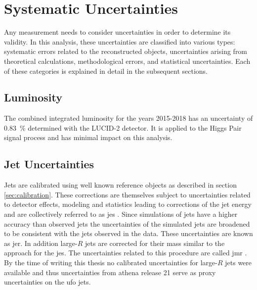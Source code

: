 \chapter{Systematic Uncertainties}\label{ch:systematics}
Any measurement needs to consider uncertainties in order to determine its validity. In this analysis, these uncertainties are classified into various types: systematic errors related to the reconstructed objects, uncertainties arising from theoretical calculations, methodological errors, and statistical uncertainties. Each of these categories is explained in detail in the subsequent sections.

\section{Luminosity}
The combined integrated luminosity for the years 2015-2018 has an uncertainty of \qty[]{0.83}{\percent} determined with the LUCID-2 detector. It is applied to the Higgs Pair signal process and has minimal impact on this analysis.

\section{Jet Uncertainties}
Jets are calibrated using well known reference objects as described in section \ref{sec:calibration}. These corrections are themselves subject to uncertainties related to detector effects, modeling and statistics leading to corrections of the jet energy and are collectively referred to as \ac{jes} \citep{atlas2021jet,Aaboud:2019aa}. Since simulations of jets have a higher accuracy than observed jets the uncertainties of the simulated jets are broadened to be consistent with the jets observed in the data. These uncertainties are known as \ac{jer}. In addition large-$R$ jets are corrected for their mass similar to the approach for the \ac{jes}. The uncertainties related to this procedure are called \ac{jmr} \citep{ATLAS-CONF-2020-022}. By the time of writing this thesis no calibrated uncertainties for large-$R$ jets were available and thus uncertainties from athena release 21 \citep{Athena} serve as proxy uncertainties on the \ac{ufo} jets.

